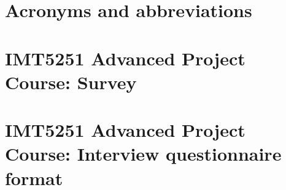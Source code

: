 \appendix
\chapter{Acronyms and abbreviations}
\label{appendix:acronyms}
\printindex
\printglossaries

\chapter{IMT5251 Advanced Project Course: Survey}
\label{appendix:survey}


\chapter{IMT5251 Advanced Project Course: Interview questionnaire format}
\label{appendix:interview}

